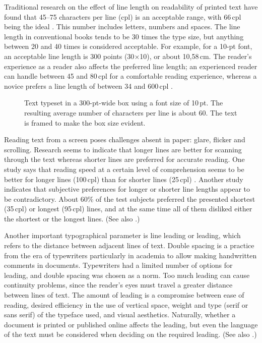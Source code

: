 \documentclass[english, 12pt, a4paper, elec, utf8, a-2b, online]{aaltothesis}
\begin{document}
Traditional research on the effect of line length on readability of printed text
have found that 45--75 characters per line (cpl) is an acceptable range, with 
66\,cpl being the ideal \cite{Bringhurst, Wikilinelength}. This number includes 
letters, numbers and spaces. The line length in conventional books tends to be 
30 times the type size, but anything between 20 and 40 times is considered 
acceptable. For example, for a 10-pt font, an acceptable line length is 300 
points (30$\times$10), or about 10,58\,cm. The reader’s experience as a reader 
also affects the preferred line length; an experienced reader can handle between
45 and 80\,cpl for a comfortable reading experience, whereas a novice prefers a 
line length of between 34 and 600\,cpl \cite{Unna}.

\begin{figure}[b]
	\centering
	\caption{Text typeset in a 300-pt-wide box using a font size of 10\,pt. The 
		resulting average number of characters per line is about 60. The text is
		framed to make the box size evident.}
\end{figure}

Reading text from a screen poses challenges absent in paper: glare, flicker and 
scrolling. Research seems to indicate that longer lines are better for scanning 
through the text whereas shorter lines are preferred for accurate reading. One 
study says that reading speed at a certain level of comprehension seems to be 
better for longer lines (100\,cpl) than for shorter lines (25\,cpl) 
\cite{Dyson}. Another study \cite{Shaik} indicates that subjective preferences 
for longer or shorter line lengths appear to be contradictory. About 60\% of 
the test subjects preferred the presented shortest (35\,cpl) or longest 
(95\,cpl) lines, and at the same time all of them disliked either the 
shortest or the longest lines. (See also \cite{Wikilinelength}.)

Another important typographical parameter is line leading or leading, which 
refers to the distance between adjacent lines of text. Double spacing is a 
practice from the era of typewriters particularly in academia to allow making 
handwritten comments in documents. Typewriters had a limited number of options 
for leading, and double spacing was chosen as a norm. Too much leading can cause
continuity problems, since the reader’s eyes must travel a greater distance 
between lines of text. The amount of leading is a compromise between ease of 
reading, desired efficiency in the use of vertical space, weight and type (serif
or sans serif) of the typeface used, and visual aesthetics. Naturally, whether a
document is printed or published online affects the leading, but even the 
language of the text must be considered when deciding on the required leading. 
(See also \cite{enwiki:1026690618}.)
\end{document}
